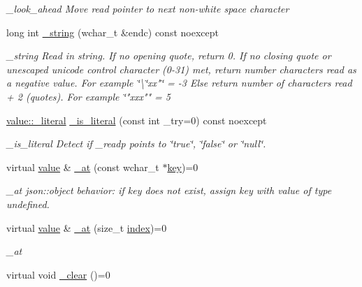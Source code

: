 \begin{DoxyCompactItemize}
\begin{DoxyCompactList}\small\item\em \+\_\+look\+\_\+ahead Move read pointer to next non-\/white space character \end{DoxyCompactList}\item 
long int \hyperlink{classformat_1_1value_aab0e0227afa4e70d382608b4d75a9140}{\+\_\+string} (wchar\+\_\+t \&endc) const noexcept
\begin{DoxyCompactList}\small\item\em \+\_\+string Read in string. If no opening quote, return 0. If no closing quote or unescaped unicode control character (0-\/31) met, return number characters read as a negative value. For example \char`\"{}\textbackslash{}\char`\"{}xx"\char`\"{} = -\/3
\+Else return number of characters read + 2 (quotes). For example \char`\"{}"xxx"" = 5 \end{DoxyCompactList}\item 
\hyperlink{classformat_1_1value_a953390030c22a816b7c9b2b54d4992a8}{value\+::\+\_\+literal} \hyperlink{classformat_1_1value_ada2428d6e7f55e46096912fdec16a17d}{\+\_\+is\+\_\+literal} (const int \+\_\+try=0) const noexcept
\begin{DoxyCompactList}\small\item\em \+\_\+is\+\_\+literal Detect if \+\_\+readp points to \char`\"{}true\char`\"{}, \char`\"{}false\char`\"{} or \char`\"{}null\char`\"{}. \end{DoxyCompactList}\item 
virtual \hyperlink{classformat_1_1value}{value} \& \hyperlink{classformat_1_1value_a3f67662acb201f2ab8a768f8cb670678}{\+\_\+at} (const wchar\+\_\+t $\ast$\hyperlink{classformat_1_1value_ad4865e7984fc9f3b5ce7c17fd7ac740c}{key})=0
\begin{DoxyCompactList}\small\item\em \+\_\+at json\+::object behavior\+: if key does not exist, assign key with value of type undefined. \end{DoxyCompactList}\item 
virtual \hyperlink{classformat_1_1value}{value} \& \hyperlink{classformat_1_1value_ab94a7f0af8ea5c60fd0e59ccde8d0371}{\+\_\+at} (size\+\_\+t \hyperlink{classformat_1_1value_aaa429b28cc0edf5a3589b89a1820ad62}{index})=0
\begin{DoxyCompactList}\small\item\em \+\_\+at \end{DoxyCompactList}\item 
virtual void \hyperlink{classformat_1_1value_a9924ec6809a88b2fc59b1be7a4835127}{\+\_\+clear} ()=0\hypertarget{classformat_1_1value_a9924ec6809a88b2fc59b1be7a4835127}{}\label{classformat_1_1value_a9924ec6809a88b2fc59b1be7a4835127}


\end{DoxyCompactItemize}
